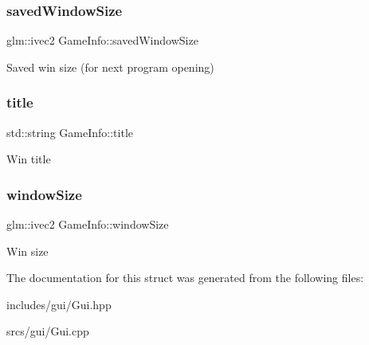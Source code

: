 \subsubsection{\texorpdfstring{saved\+Window\+Size}{savedWindowSize}}
{\footnotesize\ttfamily glm\+::ivec2 Game\+Info\+::saved\+Window\+Size}

Saved win size (for next program opening) \mbox{\label{struct_game_info_aa91c7a78dac02194f74190e511641198}} 
\subsubsection{\texorpdfstring{title}{title}}
{\footnotesize\ttfamily std\+::string Game\+Info\+::title}

Win title \mbox{\label{struct_game_info_a8dce192fef699b9f1fddbf02bf3500cd}} 
\subsubsection{\texorpdfstring{window\+Size}{windowSize}}
{\footnotesize\ttfamily glm\+::ivec2 Game\+Info\+::window\+Size}

Win size 

The documentation for this struct was generated from the following files\+:\begin{DoxyCompactItemize}
\item 
includes/gui/Gui.\+hpp\item 
srcs/gui/Gui.\+cpp\end{DoxyCompactItemize}
